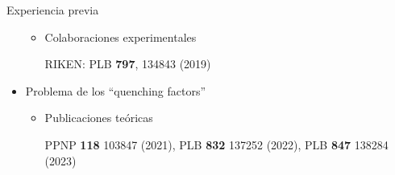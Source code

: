 \documentclass{beamer}
\begin{document}
\begin{frame}{Experiencia previa}
\begin{minipage}{0.45\textwidth}
\begin{itemize}
\begin{itemize}
    \item Colaboraciones experimentales
    
     RIKEN: PLB \textbf{797}, 134843 (2019)   
    
    \end{itemize}
    \item Problema de los ``quenching factors''
    
    \begin{itemize}
    \tiny
    \item Publicaciones teóricas
    
    PPNP \textbf{118} 103847 (2021), PLB \textbf{832} 137252 (2022), PLB \textbf{847} 138284 (2023)
\end{itemize}        
    
    \end{itemize}
    \end{minipage}
    
\end{frame}
\end{document}
